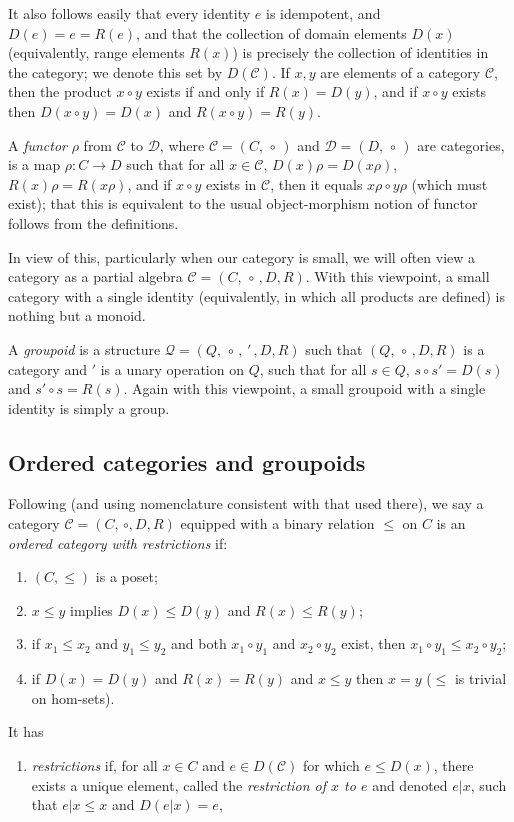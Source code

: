 \documentclass[12pt]{amsart}
\theoremstyle{definition}
\newcommand{\ben}{\begin{enumerate}}
\newcommand{\een}{\end{enumerate}}
\newcommand{\D}{\mathcal D}
\newcommand{\Q}{\mathcal Q}
\newcommand{\C}{\mathcal C}
\begin{document}
It also follows easily that every identity $e$ is idempotent, and $D(e)=e=R(e)$, and that the collection of domain elements $D(x)$ (equivalently, range elements $R(x)$) is precisely the collection of identities in the category; we denote this set by $D(\C)$.    If $x,y$ are elements of a category $\C$, then the product $x\circ y$ exists if and only if $R(x)=D(y)$, and if $x\circ y$ exists then $D(x\circ y)=D(x)$ and $R(x\circ y)=R(y)$.  

A {\em functor} $\rho$ from $\C$ to $ \D$, where $\C=(C,\, \circ\,)$
and $\D=(D,\, \circ\,)$ are categories, is a map $\rho:C\rightarrow D$ such that for all $x\in \C$, $D(x)\rho=D(x\rho)$, $R(x)\rho=R(x\rho)$, and if $x\circ y$ exists in $\C$, then it equals $x\rho\circ y\rho$ (which must exist); that this is equivalent to the usual object-morphism notion of functor follows from the definitions.

In view of this, particularly when our category is small, we will often view a category as a partial algebra $\C=(C,\, \circ\, ,D,R)$.  With this viewpoint, a small category with a single identity (equivalently, in which all products are defined) is nothing but a monoid.

A {\em groupoid} is a structure $\Q=(Q,\, \circ\, ,\, '\, ,D,R)$ such that $(Q,\, \circ\, ,D,R)$ is a category and $'$  is a unary operation  on $Q$, such that for all $s\in Q$, $s\circ s'=D(s)$ and $s'\circ s=R(s)$.  Again with this viewpoint, a small groupoid with a single identity is simply a group.

\subsection{Ordered categories and groupoids}

Following \cite{lawson1} (and using nomenclature consistent with that used there), we say a category $\C=(C,\, \circ ,D,R)$ equipped with a binary relation $\leq$ on $C$ is an {\em ordered category with restrictions} if:
\ben[label=\textup{(OC\arabic*)}]
\item $(C,\leq)$ is a poset;
\item $x\leq y$ implies $D(x)\leq D(y)$ and $R(x)\leq R(y)$;  \label{DRmono}
\item  if $x_1\leq x_2$ and $y_1\leq y_2$ and both $x_1\circ y_1$ and $x_2\circ y_2$ exist,  then $x_1\circ y_1\leq x_2\circ y_2$;\label{OC3}
\item  if $D(x)=D(y)$ and $R(x)=R(y)$ and $x\leq y$ then $x=y$ ($\leq$ is trivial on hom-sets). \label{hom}
\een
It has
\ben[label=\textup{(OC8(i))}]
\item {\em restrictions} if, for all $x\in C$ and $e\in D(\C)$ for which $e\leq D(x)$, there exists a unique element, called the {\em restriction of $x$ to $e$} and denoted $e|x$, such that $e|x\leq x$ and $D(e|x)=e$,  \label{OC8i}
\een
\end{document}
